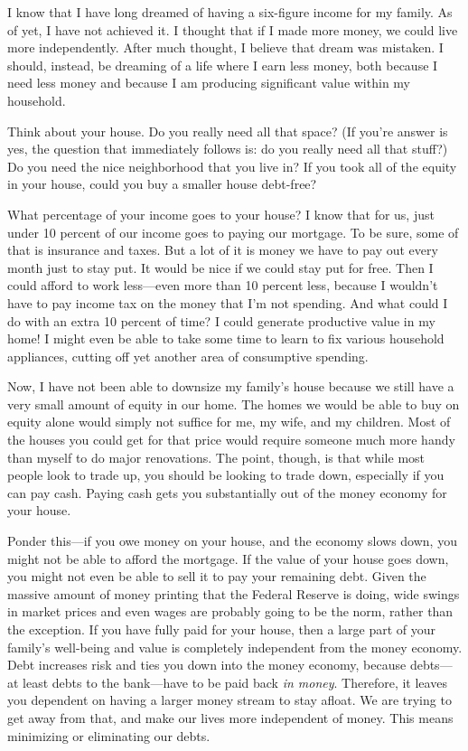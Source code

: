I know that I have long dreamed of having a six-figure income for my
family. As of yet, I have not achieved it. I thought that if I made
more money, we could live more independently. After much thought, I
believe that dream was mistaken. I should, instead, be dreaming of a
life where I earn less money, both because I need less money and
because I am producing significant value within my household.

Think about your house. Do you really need all that space?
(If you’re answer is
yes, the question that immediately follows is: do you really need all
that stuff?) Do you need the nice neighborhood that you live in?  If
you took all of the equity in your house, could you buy a smaller house
debt-free?

What percentage of your income goes to your house?  I know that for us,
just under 10 percent of our income goes to paying our mortgage. To be
sure, some of that is insurance and taxes. But a lot of it is money we
have to pay out every month just to stay put. It would be nice if we
could stay put for free. Then I could afford to work less---even more
than 10 percent less, because I wouldn’t have to pay income tax on the
money that I’m not spending. And what could I do with an extra 10
percent of time? I could generate productive value in my home! I might
even be able to take some time to learn to fix various household
appliances, cutting off yet another area of consumptive spending. 

Now, I have not been able to downsize my family's house
because we still have a very small amount of equity in our home. The
homes we would be able to buy on equity alone would simply not suffice
for me, my wife, and my children. Most of the houses you could get for
that price would require someone much more handy than myself to do
major renovations. The point, though, is that while most people look to
trade up, you should be looking to trade down, especially if you can
pay cash. Paying cash gets you substantially out of the money economy
for your house.

Ponder this---if you owe money on your house, and the economy slows down,
you might not be able to afford the mortgage. If the value of your
house goes down, you might not even be able to sell it to pay your
remaining debt. Given the massive amount of money printing that the
Federal Reserve is doing, wide swings in market prices and even wages are probably
going to be the norm, rather than the exception. If you have fully paid
for your house, then a large part of your family’s well-being and value
is completely independent from the money economy. Debt increases risk
and ties you down into the money economy, because debts---at least debts
to the bank---have to be paid back \textit{in money}.  Therefore, it
leaves you dependent on having a larger money stream to stay afloat.  We are
trying to get away from that, and make our lives more independent of
money.  This means minimizing or eliminating our debts.

